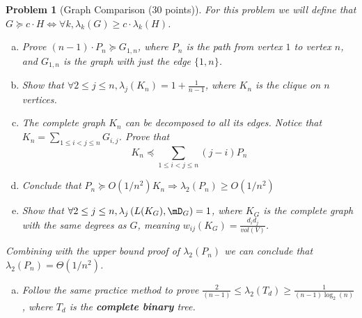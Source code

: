 \documentclass[10pt]{article}
\newcommand{\1}{\vec{\mathbbm{1}}}
\newtheorem{problem}{\sc\color{cit}Problem}
\begin{document}
\begin{problem}[Graph Comparison (30 points)]
For this problem we will define that $G \succeq c \cdot H \Leftrightarrow \forall
k, \lambda_k(G) \geq c \cdot \lambda_k(H)$.
\begin{enumerate}[(a)]
\item Prove $(n - 1) \cdot P_n \succeq G_{1,n}$, where $P_n$ is the path from
vertex $1$ to vertex $n$, and $G_{1, n}$ is the graph with just the edge $\{1, n\}
$.
\item Show that $\forall 2 \leq j \leq n, \lambda_j(K_n) = 1 + \frac{1}{n-1}$,
where $K_n$ is the clique on $n$ vertices.
\item The complete graph $K_n$ can be decomposed to all its edges. Notice that
$K_n = \sum_{1 \leq i < j \leq n} G_{i,j}$. Prove that
$$K_n \preceq \sum_{1 \leq i < j \leq n} (j - i) P_n$$
\item Conclude that $P_n \succeq O(1/n^2) K_n \Rightarrow \lambda_2(P_n) \geq
O(1/n^2)$
\item Show that $\forall 2 \leq j \leq n, \lambda_j\left(L(K_G), \mD_G\right) =
1$, where $K_G$ is the complete graph with the same degrees as $G$, meaning $w_{ij}
(K_G) = \frac{d_i d_j}{vol(V)}$.
\end{enumerate}
Combining with the upper bound proof of $\lambda_2(P_n)$ we can conclude that
$\lambda_2(P_n) = \Theta(1/n^2)$.
\begin{enumerate}[(a),resume]
\item Follow the same practice method to prove $\frac{2}{(n-1)} \leq \lambda_2(T_d) \geq \frac{1}{(n - 1) \log_2(n)}$, where $T_d$ is the {\bf complete
binary} tree.
\end{enumerate}
\end{problem}
\end{document}
